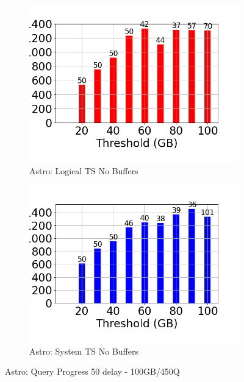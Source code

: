 \begin{figure}
\begin{subfigure}[c]{0.48\textwidth}
	\end{subfigure}
	\begin{subfigure}[c]{0.48\textwidth}
		\includegraphics[width=1\textwidth]	 {figures/Experiments/Dynamic/ASTRO/Batch_processing/50/average_query_time_per_batch_version_999777016_10485760_10_delay[50].png}
		\caption{Astro: Logical TS No Buffers}
		\label{fig:logical-ts-no-50-astro}
	\end{subfigure}
	\begin{subfigure}[c]{0.48\textwidth}
		\includegraphics[width=1\textwidth]	 {figures/Experiments/Dynamic/ASTRO/Batch_processing/50/average_query_time_per_batch_version_999777017_10485760_10_delay[50].png}
		\caption{Astro: System TS No Buffers}
		\label{fig:system-ts-no-50-astro}
	\end{subfigure}
	\caption{Astro: Query Progress 50 delay - 100GB/450Q}
	\label{fig:query-progress-50-astro}
\end{figure}
